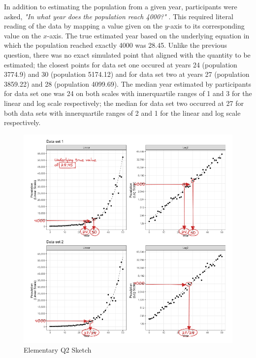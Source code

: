 \documentclass[print]{nuthesis}
\begin{document}
In addition to estimating the population from a given year, participants were asked, \textit{"In what year does the population reach 4000?"} .
This required literal reading of the data by mapping a value given on the \(y\)-axis to its corresponding value on the \(x\)-axis.
The true estimated year based on the underlying equation in which the population reached exactly 4000 was 28.45.
Unlike the previous question, there was no exact simulated point that aligned with the quantity to be estimated; the closest points for data set one occured at years 24 (population 3774.9) and 30 (population 5174.12) and for data set two at years 27 (population 3859.22) and 28 (population 4099.69).
The median year estimated by participants for data set one was 24 on both scales with innerquartile ranges of 1 and 3 for the linear and log scale respectively; the median for data set two occurred at 27 for both data sets with innerquartile ranges of 2 and 1 for the linear and log scale respectively.

\begin{figure}[tbp]

{\centering \includegraphics[width=1\linewidth,]{images/03-estimation/qe2-sketch} 

}

\caption{Elementary Q2 Sketch}\label{fig:qe2-sketch}
\end{figure}
\end{document}
